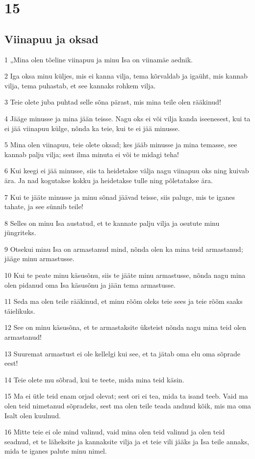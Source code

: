 \chapter{15}

\section*{Viinapuu ja oksad}

\par 1 „Mina olen tõeline viinapuu ja minu Isa on viinamäe aednik.
\par 2 Iga oksa minu küljes, mis ei kanna vilja, tema kõrvaldab ja igaüht, mis kannab vilja, tema puhastab, et see kannaks rohkem vilja.
\par 3 Teie olete juba puhtad selle sõna pärast, mis mina teile olen rääkinud!
\par 4 Jääge minusse ja mina jään teisse. Nagu oks ei või vilja kanda iseenesest, kui ta ei jää viinapuu külge, nõnda ka teie, kui te ei jää minusse.
\par 5 Mina olen viinapuu, teie olete oksad; kes jääb minusse ja mina temasse, see kannab palju vilja; sest ilma minuta ei või te midagi teha!
\par 6 Kui keegi ei jää minusse, siis ta heidetakse välja nagu viinapuu oks ning kuivab ära. Ja nad kogutakse kokku ja heidetakse tulle ning põletatakse ära.
\par 7 Kui te jääte minusse ja minu sõnad jäävad teisse, siis paluge, mis te iganes tahate, ja see sünnib teile!
\par 8 Selles on minu Isa austatud, et te kannate palju vilja ja osutute minu jüngriteks.
\par 9 Otsekui minu Isa on armastanud mind, nõnda olen ka mina teid armastanud; jääge minu armastusse.
\par 10 Kui te peate minu käsusõnu, siis te jääte minu armastusse, nõnda nagu mina olen pidanud oma Isa käsusõnu ja jään tema armastusse.
\par 11 Seda ma olen teile rääkinud, et minu rõõm oleks teie sees ja teie rõõm saaks täielikuks.
\par 12 See on minu käsusõna, et te armastaksite üksteist nõnda nagu mina teid olen armastanud!
\par 13 Suuremat armastust ei ole kellelgi kui see, et ta jätab oma elu oma sõprade eest!
\par 14 Teie olete mu sõbrad, kui te teete, mida mina teid käsin.
\par 15 Ma ei ütle teid enam orjad olevat; sest ori ei tea, mida ta isand teeb. Vaid ma olen teid nimetanud sõpradeks, sest ma olen teile teada andnud kõik, mis ma oma Isalt olen kuulnud.
\par 16 Mitte teie ei ole mind valinud, vaid mina olen teid valinud ja olen teid seadnud, et te läheksite ja kannaksite vilja ja et teie vili jääks ja Isa teile annaks, mida te iganes palute minu nimel.

